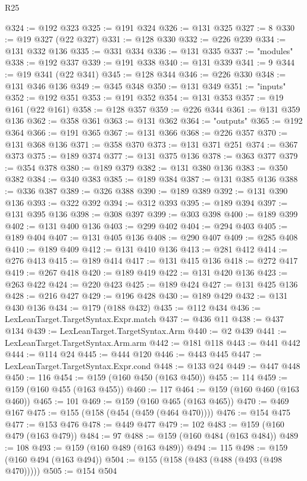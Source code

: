\begin{lexlean}{R25}
\begin{coremodule}
{{{{{{{{{{{{{{{{{{{{{{{{{{{{{{{{{{{{{{{{{{{{{{{{{{{{{{{{{{{{{{{{{{{{{{{{{{{{{{{{{{{{{{{{{{{{{{{{{{{{{{{{{{{{{{{{{{{{{{{{{{{{{{{{{{{{{{{{{{{{{{{{{{{{{{{{{{{{{{{{{{{{{{{{{{{{{{{{{{{{{{{{{{{{{{{{{{{{{{{@324 := @192 @323
@325 := @191 @324
@326 := @131 @325
@327 := 8
@330 := @19 @327 (@22 @327)
@331 := @128 @330
@332 := @226 @239
@334 := @131 @332 @136
@335 := @331 @334
@336 := @131 @335
@337 := "modules"
@338 := @192 @337
@339 := @191 @338
@340 := @131 @339
@341 := 9
@344 := @19 @341 (@22 @341)
@345 := @128 @344
@346 := @226 @330
@348 := @131 @346 @136
@349 := @345 @348
@350 := @131 @349
@351 := "inputs"
@352 := @192 @351
@353 := @191 @352
@354 := @131 @353
@357 := @19 @161 (@22 @161)
@358 := @128 @357
@359 := @226 @344
@361 := @131 @359 @136
@362 := @358 @361
@363 := @131 @362
@364 := "outputs"
@365 := @192 @364
@366 := @191 @365
@367 := @131 @366
@368 := @226 @357
@370 := @131 @368 @136
@371 := @358 @370
@373 := @131 @371 @251
@374 := @367 @373
@375 := @189 @374
@377 := @131 @375 @136
@378 := @363 @377
@379 := @354 @378
@380 := @189 @379
@382 := @131 @380 @136
@383 := @350 @382
@384 := @340 @383
@385 := @189 @384
@387 := @131 @385 @136
@388 := @336 @387
@389 := @326 @388
@390 := @189 @389
@392 := @131 @390 @136
@393 := @322 @392
@394 := @312 @393
@395 := @189 @394
@397 := @131 @395 @136
@398 := @308 @397
@399 := @303 @398
@400 := @189 @399
@402 := @131 @400 @136
@403 := @299 @402
@404 := @294 @403
@405 := @189 @404
@407 := @131 @405 @136
@408 := @290 @407
@409 := @285 @408
@410 := @189 @409
@412 := @131 @410 @136
@413 := @281 @412
@414 := @276 @413
@415 := @189 @414
@417 := @131 @415 @136
@418 := @272 @417
@419 := @267 @418
@420 := @189 @419
@422 := @131 @420 @136
@423 := @263 @422
@424 := @220 @423
@425 := @189 @424
@427 := @131 @425 @136
@428 := @216 @427
@429 := @196 @428
@430 := @189 @429
@432 := @131 @430 @136
@434 := @179 (@188 @432)
@435 := @112 @434
@436 := LexLeanTarget.TargetSyntax.Expr.match
@437 := @436 @11
@438 := @437 @134
@439 := LexLeanTarget.TargetSyntax.Arm
@440 := @2 @439
@441 := LexLeanTarget.TargetSyntax.Arm.arm
@442 := @181 @118
@443 := @441 @442
@444 := @114 @24
@445 := @444 @120
@446 := @443 @445
@447 := LexLeanTarget.TargetSyntax.Expr.cond
@448 := @133 @24
@449 := @447 @448
@450 := 116
@454 := @159 (@160 @450 (@163 @450))
@455 := 114
@459 := @159 (@160 @455 (@163 @455))
@460 := 117
@464 := @159 (@160 @460 (@163 @460))
@465 := 101
@469 := @159 (@160 @465 (@163 @465))
@470 := @469 @167
@475 := @155 (@158 (@454 (@459 (@464 @470))))
@476 := @154 @475
@477 := @153 @476
@478 := @449 @477
@479 := 102
@483 := @159 (@160 @479 (@163 @479))
@484 := 97
@488 := @159 (@160 @484 (@163 @484))
@489 := 108
@493 := @159 (@160 @489 (@163 @489))
@494 := 115
@498 := @159 (@160 @494 (@163 @494))
@504 := @155 (@158 (@483 (@488 (@493 (@498 @470)))))
@505 := @154 @504
}}}}}}}}}}}}}}}}}}}}}}}}}}}}}}}}}}}}}}}}}}}}}}}}}}}}}}}}}}}}}}}}}}}}}}}}}}}}}}}}}}}}}}}}}}}}}}}}}}}}}}}}}}}}}}}}}}}}}}}}}}}}}}}}}}}}}}}}}}}}}}}}}}}}}}}}}}}}}}}}}}}}}}}}}}}}}}}}}}}}}}}}}}}}}}}}}}}}}}}
\end{coremodule}
\end{lexlean}
